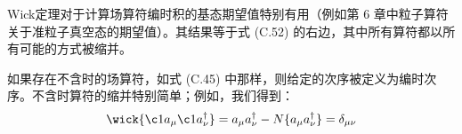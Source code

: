 Wick定理对于计算场算符编时积的基态期望值特别有用（例如第 6 章中粒子算符关于准粒子真空态的期望值）。其结果等于式 (C.52)
的右边，其中所有算符都以所有可能的方式被缩并。

如果存在不含时的场算符，如式 (C.45) 中那样，则给定的次序被定义为编时次序。不含时算符的缩并特别简单；例如，我们得到：
\begin{equation}
\wick{\c1{a}_{\mu}\c1{a}^{\dagger}_{\nu}}=a_{\mu}a^{\dagger}_{\nu}-N\{a_{\mu}a^{\dagger}_{\nu}\}=\delta_{\mu\nu}\label{eq:appendix_c_time_independent_contraction}
\end{equation}

